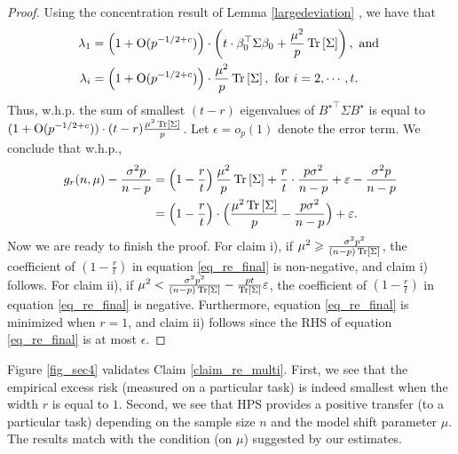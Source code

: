 \begin{proof}
    Using the concentration result of Lemma \ref{largedeviation} , we have that
    \begin{align*}
        \lambda_1 &= \Big(1+\OO(p^{-1/2+c})\Big)\cdot\left(t\cdot \beta_0^\top \Sigma \beta_0  + \frac{\mu^2}{ p}\bigtr{\Sigma}\right) , \text{ and } \\
        \lambda_i &= \Big(1+\OO(p^{-1/2+c})\Big)\cdot \frac{\mu^2}{ p}\bigtr{\Sigma}, \text{ for } i=2,\cdots, t.
    \end{align*}
    Thus, w.h.p. the sum of smallest $(t - r)$ eigenvalues of ${B^{\star}}^{\top}\Sigma  B^{\star}$ is equal to
    $(1+\operatorname{O}(p^{-1/2+c}))\cdot(t-r)\frac{\mu^2 \operatorname{Tr}\left[\Sigma\right]}{p}$.
    Let $\epsilon = o_p(1)$ denote the error term.
    We conclude that w.h.p.,
    \begin{align}
        g_r(n, \mu) - \frac{\sigma^2 p}{n - p} &= \bigbrace{1 - \frac{r}{t}} \frac{\mu^2}{p}\bigtr{\Sigma} + \frac{r}{t} \cdot \frac{p\sigma^2 }{n - p} + \epsilon - \frac{\sigma^2 p}{n - p} \nonumber \\
        &= \Big(1 - \frac r t\Big) \cdot \Big(\frac{\mu^2\bigtr{\Sigma}}{p} - \frac{p\sigma^2}{n - p}\Big) + \epsilon. \label{eq_re_final}
    \end{align}
    Now we are ready to finish the proof.
    For claim i), if $\mu^2 \geqslant \frac{\sigma^2 p^2}{(n - p) \operatorname{Tr}\left[\Sigma\right]}$, the coefficient of $(1 - \frac r t)$ in equation \eqref{eq_re_final} is non-negative, and claim i) follows.
    For claim ii), if $\mu^2 < \frac{\sigma^2 p^2}{(n - p)\operatorname{Tr}\left[\Sigma\right]} - \frac{p t}{\operatorname{Tr}\left[\Sigma\right]}\varepsilon$, the coefficient of $(1 - \frac r t)$ in equation \eqref{eq_re_final} is negative.
    Furthermore, equation \eqref{eq_re_final} is minimized when $r = 1$, and claim ii) follows since the RHS of equation \eqref{eq_re_final} is at most $\epsilon$.
\end{proof}


Figure \ref{fig_sec4} validates Claim \ref{claim_re_multi}.
First, we see that the empirical excess risk (measured on a particular task) is indeed smallest when the width $r$ is equal to $1$.
Second, we see that HPS provides a positive transfer (to a particular task) depending on the sample size $n$ and the model shift parameter $\mu$.
The results match with the condition (on $\mu$) suggested by our estimates.













